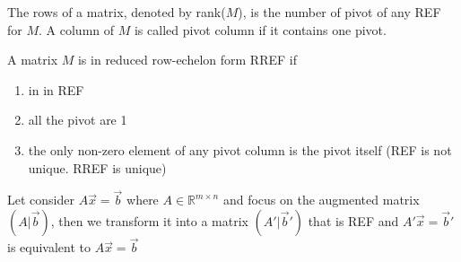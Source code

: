 The rows of a matrix, denoted by rank($M$), is the number of pivot of any REF for $M$. A column of $M$ is called pivot column if it contains one pivot.

A matrix $M$ is in reduced row-echelon form RREF if 
\begin{enumerate}
    \item in in REF
    \item all the pivot are 1
    \item the only non-zero element of any pivot column is the pivot itself (REF is not unique. RREF is unique)
\end{enumerate}
Let consider $A \vec x = \vec b$ where $A \in \mathbb{R}^{m\times n}$ and focus on the augmented matrix $\left(A|\vec b\right)$, then we transform it into a matrix $\left(A'|\vec b'\right)$ that is REF and $A' \vec x = \vec b'$ is equivalent to $A \vec x = \vec b$
